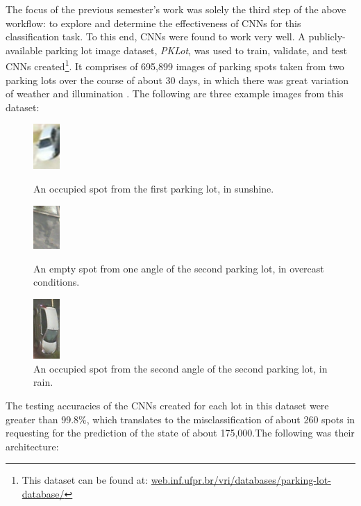 \documentclass[a4paper, 11pt]{article} %
\begin{document}
	The focus of the previous semester's work was solely the third step of the above workflow: to 
	explore and determine the effectiveness of CNNs for this classification task. To this end, CNNs were 
	found to work very well. A publicly-available parking lot image dataset, \textit{PKLot}, was used to 
	train, validate, and test CNNs created\footnote{This dataset can be found at: 
	\hyperlink{https://web.inf.ufpr.br/vri/databases/parking-lot-database/}
	{web.inf.ufpr.br/vri/databases/parking-lot-database/}}. It comprises of 695,899 images of 
	parking spots taken from two parking lots over the course of about 30 days, in which there was 
	great variation of weather and illumination \cite{pklot-paper}\relax. The following are three example 
	images from this dataset:
	\vskip 5mm
	\begin{figure}[h]
		\centering
		\includegraphics[width=1cm]{figures/pklot_example_1.jpg}
		\caption{An occupied spot from the first parking lot, in sunshine.}
		\vspace{5mm}
		\includegraphics[width=1cm]{figures/pklot_example_2.jpg}
		\caption{An empty spot from one angle of the second parking lot, in overcast conditions.}
		\vspace{5mm}
		\includegraphics[width=1cm]{figures/pklot_example_3.jpg}
		\caption{An occupied spot from the second angle of the second parking lot, in rain.}
	\end{figure}
	\hspace*{-6mm}The testing accuracies of the CNNs created for each lot in this dataset were greater 
	than 99.8\%, which translates to the misclassification of about 260 spots in requesting for the 
	prediction of the state of about 175,000.The following was their architecture:
	\newpage
\end{document}
